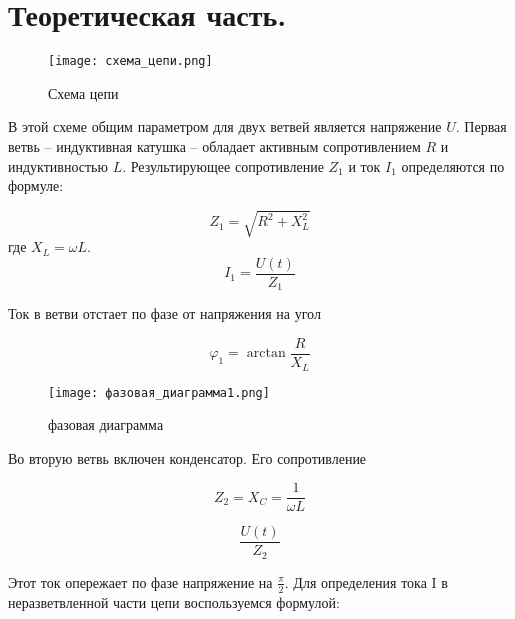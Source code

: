 



    

    \section*{Теоретическая часть.}

    \begin{figure}[h!]
        \centering
        \texttt{[image: схема\_цепи.png]}
        \caption{Схема цепи}
    \end{figure}

    \noindent В этой схеме общим параметром для двух ветвей является напряжение $U$. 
    Первая ветвь -- индуктивная катушка -- обладает активным сопротивлением $R$ и индуктивностью $L$. 
    Результирующее сопротивление $Z_1$ и ток $I_1$ определяются по формуле:

    \begin{equation*}
        Z_1 = \sqrt{R^2 + X_L^2}
    \end{equation*}
    где $X_L = \omega L$.
    \begin{equation*}
        I_1 = \frac{U(t)}{Z_1}
    \end{equation*}

    \noindent Ток в ветви отстает по фазе от напряжения на угол

    \begin{equation*}
        \varphi_1 = \arctan \frac{R}{X_L}
    \end{equation*}

    \begin{figure}[h!]
        \centering
        \texttt{[image: фазовая\_диаграмма1.png]}
        \caption{фазовая диаграмма}
    \end{figure}

    \noindent Во вторую ветвь включен конденсатор. Его сопротивление

    \begin{equation*}
        Z_2 = X_C = \frac{1}{\omega L}
    \end{equation*}

    \begin{equation*}
        \frac{U(t)}{Z_2}
    \end{equation*}

    \noindent Этот ток опережает по фазе напряжение на $\frac{\pi}{2}$.
    Для определения тока I в неразветвленной части цепи воспользуемся формулой:


